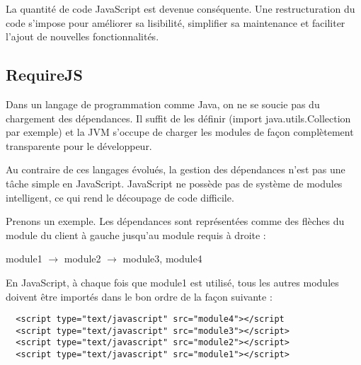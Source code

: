 La quantité de code JavaScript est devenue conséquente. Une restructuration du
code s'impose pour améliorer sa lisibilité, simplifier sa maintenance et
faciliter l'ajout de nouvelles fonctionnalités.



\subsection{RequireJS}

Dans un langage de programmation comme Java, on ne se soucie pas du chargement
des dépendances. Il suffit de les définir (import java.utils.Collection par
exemple) et la JVM s'occupe de charger les modules de façon complètement
transparente pour le développeur.

Au contraire de ces langages évolués, la gestion des dépendances n'est pas
une tâche simple en JavaScript.
JavaScript ne possède pas de système de modules intelligent, ce qui rend le
découpage de code difficile.

Prenons un exemple. Les dépendances sont représentées comme des flèches du
module du client à gauche jusqu'au module requis à droite :

module1 $\rightarrow$ module2 $\rightarrow$ module3, module4 

En JavaScript, à chaque fois que module1 est utilisé, tous les autres modules
doivent être importés dans le bon ordre de la façon suivante :
\lstset{language=XML}
\begin{lstlisting}
  <script type="text/javascript" src="module4"></script
  <script type="text/javascript" src="module3"></script>
  <script type="text/javascript" src="module2"></script>
  <script type="text/javascript" src="module1"></script>
\end{lstlisting}

